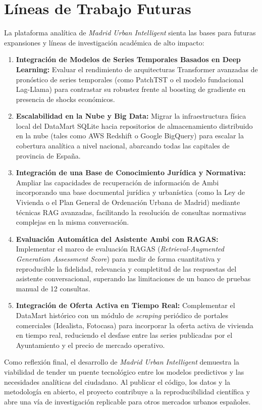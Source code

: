 \documentclass[a4paper,11pt,openany]{book}
\begin{document}
\section{Líneas de Trabajo Futuras}
La plataforma analítica de \textit{Madrid Urban Intelligent} sienta las bases para futuras expansiones y líneas de investigación académica de alto impacto:
\begin{enumerate}
    \item \textbf{Integración de Modelos de Series Temporales Basados en Deep Learning:} Evaluar el rendimiento de arquitecturas Transformer avanzadas de pronóstico de series temporales (como PatchTST o el modelo fundacional Lag-Llama) para contrastar su robustez frente al boosting de gradiente en presencia de shocks económicos.
    \item \textbf{Escalabilidad en la Nube y Big Data:} Migrar la infraestructura física local del DataMart SQLite hacia repositorios de almacenamiento distribuido en la nube (tales como AWS Redshift o Google BigQuery) para escalar la cobertura analítica a nivel nacional, abarcando todas las capitales de provincia de España.
    \item \textbf{Integración de una Base de Conocimiento Jurídica y Normativa:} Ampliar las capacidades de recuperación de información de Ambi incorporando una base documental jurídica y urbanística (como la Ley de Vivienda o el Plan General de Ordenación Urbana de Madrid) mediante técnicas RAG avanzadas, facilitando la resolución de consultas normativas complejas en la misma conversación.
    \item \textbf{Evaluación Automática del Asistente Ambi con RAGAS:} Implementar el marco de evaluación RAGAS (\textit{Retrieval-Augmented Generation Assessment Score}) para medir de forma cuantitativa y reproducible la fidelidad, relevancia y completitud de las respuestas del asistente conversacional, superando las limitaciones de un banco de pruebas manual de 12 consultas.
    \item \textbf{Integración de Oferta Activa en Tiempo Real:} Complementar el DataMart histórico con un módulo de \textit{scraping} periódico de portales comerciales (Idealista, Fotocasa) para incorporar la oferta activa de vivienda en tiempo real, reduciendo el desfase entre las series publicadas por el Ayuntamiento y el precio de mercado operativo.
\end{enumerate}

Como reflexión final, el desarrollo de \textit{Madrid Urban Intelligent} demuestra la viabilidad de tender un puente tecnológico entre los modelos predictivos y las necesidades analíticas del ciudadano. Al publicar el código, los datos y la metodología en abierto, el proyecto contribuye a la reproducibilidad científica y abre una vía de investigación replicable para otros mercados urbanos españoles.
\end{document}
